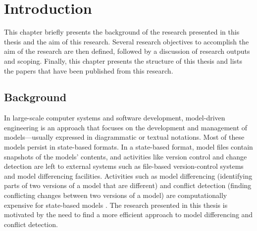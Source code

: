 \chapter{Introduction}
\label{ch:introduction}
This chapter briefly presents the background of the research presented in this thesis and the aim of this research. Several research objectives to accomplish the aim of the research are then defined, followed by a discussion of research outputs and scoping. Finally, this chapter presents the structure of this thesis and lists the papers that have been published from this research.

\section{Background}
\label{sec:background}
In large-scale computer systems and software development, model-driven engineering is an approach that focuses on the development and management of models—usually expressed in diagrammatic or textual notations. Most of these models persist in state-based formats. In a state-based format, model files contain snapshots of the models’ contents, and activities like version control and change detection are left to external systems such as file-based version-control systems and model differencing facilities. Activities such as model differencing (identifying parts of two versions of a model that are different) and conflict detection (finding conflicting changes between two versions of a model) are computationally expensive for state-based models \cite{Kolovos:2009:DMM:1564596.1564641}. The research presented in this thesis is motivated by the need to find a more efficient approach to model differencing and conflict detection.

